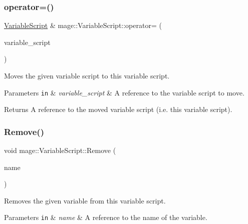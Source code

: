 \subsubsection{\texorpdfstring{operator=()}{operator=()}\hspace{0.1cm}{\footnotesize\ttfamily [2/2]}}
{\footnotesize\ttfamily \mbox{\hyperlink{classmage_1_1_variable_script}{Variable\+Script}} \& mage\+::\+Variable\+Script\+::operator= (\begin{DoxyParamCaption}\item[{\mbox{\hyperlink{classmage_1_1_variable_script}{Variable\+Script}} \&\&}]{variable\+\_\+script }\end{DoxyParamCaption})\hspace{0.3cm}{\ttfamily [noexcept]}}

Moves the given variable script to this variable script.


\begin{DoxyParams}[1]{Parameters}
\mbox{\tt in}  & {\em variable\+\_\+script} & A reference to the variable script to move. \\
\hline
\end{DoxyParams}
\begin{DoxyReturn}{Returns}
A reference to the moved variable script (i.\+e. this variable script). 
\end{DoxyReturn}
\mbox{\label{classmage_1_1_variable_script_aac74a9edbe78e0caa1095ce32835501d}} 
\subsubsection{\texorpdfstring{Remove()}{Remove()}}
{\footnotesize\ttfamily void mage\+::\+Variable\+Script\+::\+Remove (\begin{DoxyParamCaption}\item[{const string \&}]{name }\end{DoxyParamCaption})}

Removes the given variable from this variable script.


\begin{DoxyParams}[1]{Parameters}
\mbox{\tt in}  & {\em name} & A reference to the name of the variable. \\
\hline
\end{DoxyParams}
\mbox{\label{classmage_1_1_variable_script_add51955d83e85e6d6acd82cfe40bed26}} 
